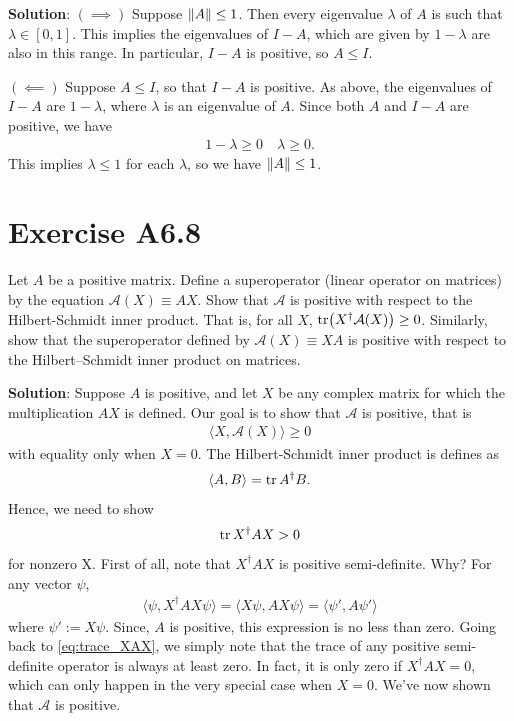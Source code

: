 \documentclass{book}
\newcommand{\mc}[1]{\mathcal{#1}}
\begin{document}
    \textbf{Solution}: $(\implies)$ Suppose $\norm{A}\leq 1$. Then every eigenvalue $\lambda$ of $A$ is such that $\lambda \in [0,1]$. This implies the eigenvalues of $I-A$, which are given by $1-\lambda$ are also in this range. In particular, $I-A$ is positive, so $A\leq I$.
    
    $(\impliedby)$ Suppose $A\leq I$, so that $I-A$ is positive. As above, the eigenvalues of $I-A$ are $1-\lambda$, where $\lambda$ is an eigenvalue of $A$. Since both $A$ and $I-A$ are positive, we have
    \begin{align}
        1-\lambda \geq 0 \quad \lambda \geq 0.
    \end{align}
    This implies $\lambda \leq 1$ for each $\lambda$, so we have $\norm{A}\leq 1$.

\section*{Exercise A6.8}
    Let $A$ be a positive matrix. Define a superoperator (linear operator on matrices) by the equation $\mc{A}(X) \equiv A X$. Show that $\mc{A}$ is positive with respect to the Hilbert-Schmidt inner product. That is, for all $X$, $\tr(X^\dagger \mc{A}(X)) \geq 0$. Similarly, show that the superoperator defined by $\mc{A} (X) \equiv XA$ is positive with respect to the Hilbert–Schmidt inner product on matrices.
    
    \textbf{Solution}: Suppose $A$ is positive, and let $X$ be any complex matrix for which the multiplication $AX$ is defined. Our goal is to show that $\mc{A}$ is positive, that is
    \begin{align} \label{eq:trace_XAX}
        \langle X, \mc{A}(X)\rangle \geq 0
    \end{align}
    with equality only when $X = 0$. The Hilbert-Schmidt inner product is defines as
    \begin{align}
        \langle A, B \rangle = \tr A^\dagger B.
    \end{align}
    Hence, we need to show
    \begin{align}
        \tr X^\dagger A X > 0
    \end{align}
    for nonzero X. First of all, note that $X^\dagger A X$ is positive semi-definite. Why? For any vector $\psi$,
    \begin{align}
        \langle \psi, X^\dagger A X \psi \rangle = \langle X \psi, A X \psi \rangle = \langle \psi', A \psi'\rangle
    \end{align}
    where $\psi' := X \psi$. Since, $A$ is positive, this expression is no less than zero. Going back to \eqref{eq:trace_XAX}, we simply note that the trace of any positive semi-definite operator is always at least zero. In fact, it is only zero if $X^\dagger A X = 0$, which can only happen in the very special case when $X = 0$. We've now shown that $\mc{A}$ is positive.
\end{document}
